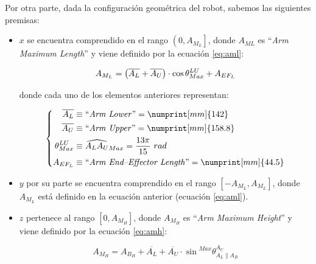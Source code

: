 Por otra parte, dada la configuración geométrica del robot, sabemos las siguientes premisas:

\begin{itemize}
    \item $x$ se encuentra comprendido en el rango $\left(0, A_{M_L}\right]$, donde $A_{ML}$
          es ``\textit{Arm Maximum Length}'' y viene definido por la ecuación \ref{eq:aml}:

          \begin{equation}\label{eq:aml}
              A_{M_L} = \left(\overline{A_L} + \overline{A_U}\right) \cdot \cos{\theta^{LU}_{Max}} + A_{EF_L}\\
          \end{equation}

          donde cada uno de los elementos anteriores representan:

          \begin{equation*}
              \left\{\begin{aligned}
                  \overline{A_L}    & \equiv \text{``\textit{Arm Lower}''} = \numprint[mm]{142}                 \\
                  \overline{A_U}    & \equiv \text{``\textit{Arm Upper}''} = \numprint[mm]{158.8}               \\
                  \theta^{LU}_{Max} & \equiv \widehat{A_L A_U}_{Max} = \frac{13\pi}{15}~rad                     \\
                  A_{EF_L}          & \equiv \text{``\textit{Arm End--Effector Length}''} = \numprint[mm]{44.5} \\
              \end{aligned}
              \right.
          \end{equation*}

    \item $y$ por su parte se encuentra comprendido en el rango $\left[-A_{M_L}, A_{M_L}\right]$,
          donde $A_{M_L}$ está definido en la ecuación anterior (ecuación \ref{eq:aml}).
    \item $z$ pertenece al rango $\left[0, A_{M_H}\right]$, donde $A_{M_H}$ es
          ``\textit{Arm Maximum Height}'' y viene definido por la ecuación \ref{eq:amh}:

          \begin{equation}\label{eq:amh}
              A_{M_H} = A_{B_H} + \overline{A_L} + \overline{A_U} \cdot \sin{^{Max}\theta^{A_U}_{A_L \parallel A_B}}
          \end{equation}


\end{itemize}

